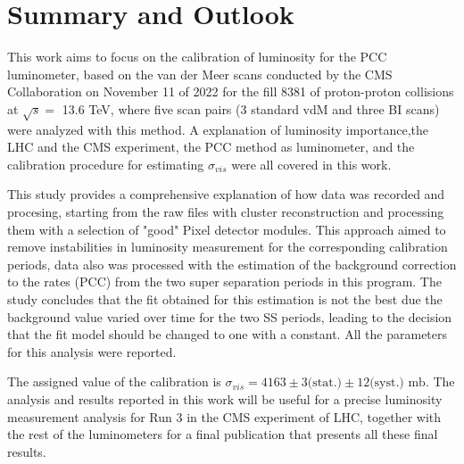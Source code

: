 \chapter{Summary and Outlook}

This work aims to focus on the calibration of luminosity for the PCC  luminometer, based on the van der Meer scans conducted by the CMS Collaboration on November 11 of 2022 for the fill 8381 of proton-proton collisions at $\sqrt{s}=$ 13.6 TeV, where five scan pairs (3 standard vdM and three BI scans) were analyzed with this method.
A explanation of luminosity importance,the LHC and the CMS experiment, the PCC method as luminometer, and the calibration procedure for estimating $\sigma_{vis}$ were all covered in this work.

This study provides a comprehensive explanation of how data was recorded and procesing, starting from the raw files with cluster reconstruction and processing them with a  selection of  "good" Pixel detector modules. This approach aimed to remove instabilities in luminosity measurement for the corresponding calibration periods,  data also was processed with the  estimation of the background correction to the rates (PCC) from the two super separation periods in this program. The study concludes that the fit obtained for this  estimation is not the best due the background value varied over time for the two SS periods, leading to the decision that the fit model should be changed to one with a constant. All the parameters for this analysis were reported.

The assigned value of the calibration is $\sigma_{vis} = 4163 \pm 3 \text{(stat.)} \pm 12 \text{(syst.)} \text{ mb}$. The analysis and results reported in this work will be useful for a precise luminosity measurement analysis for Run 3 in the CMS experiment of LHC, together with the rest of the luminometers  for a final publication that presents all these final results.
